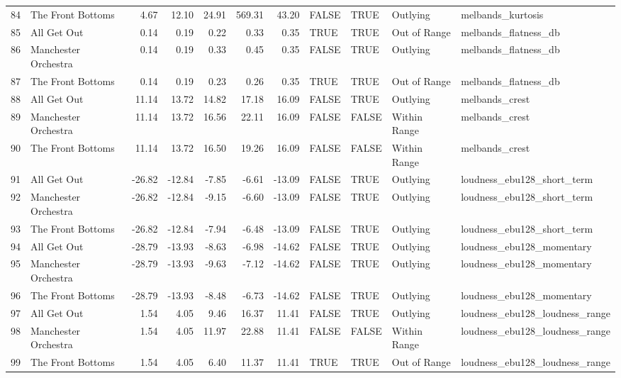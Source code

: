 \begin{table}[ht]
\begin{tabular}{rlrrrrrllll}
  84 & The Front Bottoms & 4.67 & 12.10 & 24.91 & 569.31 & 43.20 & FALSE & TRUE & Outlying & melbands\_kurtosis \\ 
  85 & All Get Out & 0.14 & 0.19 & 0.22 & 0.33 & 0.35 & TRUE & TRUE & Out of Range & melbands\_flatness\_db \\ 
  86 & Manchester Orchestra & 0.14 & 0.19 & 0.33 & 0.45 & 0.35 & FALSE & TRUE & Outlying & melbands\_flatness\_db \\ 
  87 & The Front Bottoms & 0.14 & 0.19 & 0.23 & 0.26 & 0.35 & TRUE & TRUE & Out of Range & melbands\_flatness\_db \\ 
  88 & All Get Out & 11.14 & 13.72 & 14.82 & 17.18 & 16.09 & FALSE & TRUE & Outlying & melbands\_crest \\ 
  89 & Manchester Orchestra & 11.14 & 13.72 & 16.56 & 22.11 & 16.09 & FALSE & FALSE & Within Range & melbands\_crest \\ 
  90 & The Front Bottoms & 11.14 & 13.72 & 16.50 & 19.26 & 16.09 & FALSE & FALSE & Within Range & melbands\_crest \\ 
  91 & All Get Out & -26.82 & -12.84 & -7.85 & -6.61 & -13.09 & FALSE & TRUE & Outlying & loudness\_ebu128\_short\_term \\ 
  92 & Manchester Orchestra & -26.82 & -12.84 & -9.15 & -6.60 & -13.09 & FALSE & TRUE & Outlying & loudness\_ebu128\_short\_term \\ 
  93 & The Front Bottoms & -26.82 & -12.84 & -7.94 & -6.48 & -13.09 & FALSE & TRUE & Outlying & loudness\_ebu128\_short\_term \\ 
  94 & All Get Out & -28.79 & -13.93 & -8.63 & -6.98 & -14.62 & FALSE & TRUE & Outlying & loudness\_ebu128\_momentary \\ 
  95 & Manchester Orchestra & -28.79 & -13.93 & -9.63 & -7.12 & -14.62 & FALSE & TRUE & Outlying & loudness\_ebu128\_momentary \\ 
  96 & The Front Bottoms & -28.79 & -13.93 & -8.48 & -6.73 & -14.62 & FALSE & TRUE & Outlying & loudness\_ebu128\_momentary \\ 
  97 & All Get Out & 1.54 & 4.05 & 9.46 & 16.37 & 11.41 & FALSE & TRUE & Outlying & loudness\_ebu128\_loudness\_range \\ 
  98 & Manchester Orchestra & 1.54 & 4.05 & 11.97 & 22.88 & 11.41 & FALSE & FALSE & Within Range & loudness\_ebu128\_loudness\_range \\ 
  99 & The Front Bottoms & 1.54 & 4.05 & 6.40 & 11.37 & 11.41 & TRUE & TRUE & Out of Range & loudness\_ebu128\_loudness\_range \\ 

\end{tabular}
\end{table}
